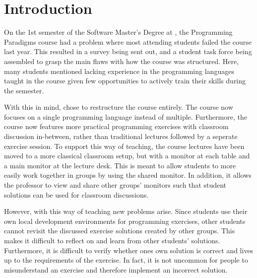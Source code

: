 \chapter{Introduction} \label{chap:introduction}
On the 1st semester of the Software Master’s Degree at \aau{}, the Programming Paradigms course had a problem where most attending students failed the course last year. 
This resulted in a survey being sent out, and a student task force being assembled to grasp the main flaws with how the course was structured. 
Here, many students mentioned lacking experience in the programming languages taught in the course given few opportunities to actively train their skills during the semester. 


With this in mind, \aau{} chose to restructure the course entirely. 
The course now focuses on a single programming language instead of multiple. 
Furthermore, the course now features more practical programming exercises with classroom discussion in-between, rather than traditional lectures followed by a seperate exercise session.
To support this way of teaching, the course lectures have been moved to a more classical classroom setup, but with a monitor at each table and a main monitor at the lecture desk. 
This is meant to allow students to more easily work together in groups by using the shared monitor.
In addition, it allows the professor to view and share other groups' monitors such that student solutions can be used for classroom discussions. 


However, with this way of teaching new problems arise.
Since students use their own local development environments for programming exercises, other students cannot revisit the discussed exercise solutions created by other groups. This makes it difficult to reflect on and learn from other students' solutions.
Furthermore, it is difficult to verify whether ones own solution is correct and lives up to the requirements of the exercise.
In fact, it is not uncommon for people to misunderstand an exercise and therefore implement an incorrect solution.

